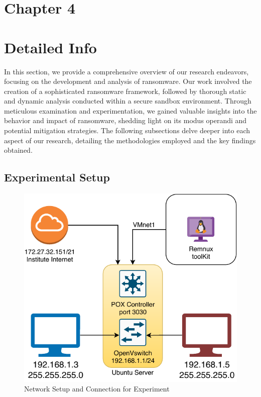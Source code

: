 \documentclass[12pt,letterpaper]{article}
\begin{document}
    
            
\clearpage    
    \newpage
    \section*{Chapter 4}
        \section{Detailed Info}

            In this section, we provide a comprehensive overview of our research endeavors, focusing on the development and analysis of ransomware. Our work involved the creation of a sophisticated ransomware framework, followed by thorough static and dynamic analysis conducted within a secure sandbox environment. Through meticulous examination and experimentation, we gained valuable insights into the behavior and impact of ransomware, shedding light on its modus operandi and potential mitigation strategies. The following subsections delve deeper into each aspect of our research, detailing the methodologies employed and the key findings obtained.
            
            
        \subsection{Experimental Setup}

        \begin{figure}[htt]
            \centering
            \includegraphics{images/NetworkSetip.drawio.pdf}
            \caption{Network Setup and Connection for Experiment}
            \label{fig:Network Setup and Connection for Experiment}
        \end{figure}
\end{document}
